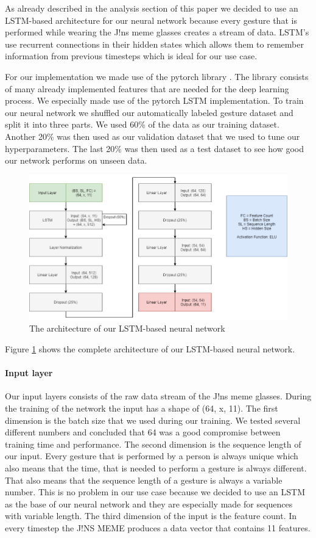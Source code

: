 \documentclass[runningheads]{llncs}
\begin{document}
As already described in the analysis section of this paper we decided to use an LSTM-based architecture for our neural network because every gesture that is performed while wearing the J!ns meme glasses creates a stream of data. LSTM's use recurrent connections in their hidden states which allows them to remember information from previous timesteps which is ideal for our use case.
\par
For our implementation we made use of the pytorch library \cite{NEURIPS2019_9015}. The library consists of many already implemented features that are needed for the deep learning process. We especially made use of the pytorch LSTM implementation. To train our neural network we shuffled our automatically labeled gesture dataset and split it into three parts. We used 60\% of the data as our training dataset. Another 20\% was then used as our validation dataset that we used to tune our hyperparameters. The last 20\% was then used as a test dataset to see how good our network performs on unseen data.
\begin{figure}
\centering
\includegraphics[width=\textwidth]{LSTM_Architecture.png}
\caption{The architecture of our LSTM-based neural network}
\label{fig:lstmarchitecture}
\end{figure}
Figure \ref{fig:lstmarchitecture} shows the complete architecture of our LSTM-based neural network.
\paragraph{Input layer}
Our input layers consists of the raw data stream of the J!ns meme glasses. During the training of the network the input has a shape of (64, x, 11). The first dimension is the batch size that we used during our training. We tested several different numbers and concluded that 64 was a good compromise between training time and performance. The second dimension is the sequence length of our input. Every gesture that is performed by a person is always unique which also means that the time, that is needed to perform a gesture is always different. That also means that the sequence length of a gesture is always a variable number. This is no problem in our use case because we decided to use an LSTM as the base of our neural network and they are especially made for sequences with variable length. The third dimension of the input is the feature count. In every timestep the J!NS MEME produces a data vector that contains 11 features.
\end{document}

